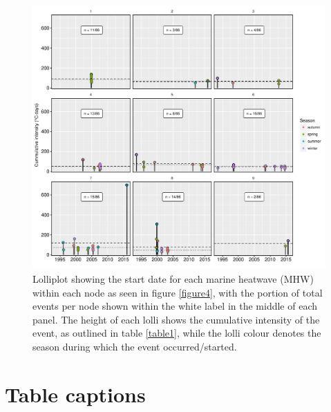 \documentclass[utf8]{frontiersSCNS}
\begin{document}
\begin{figure}[]
\begin{center}
\includegraphics[width=1.0\textwidth]{figure_5.pdf}
\end{center}
\caption{Lolliplot showing the start date for each marine heatwave (MHW) within each node as seen in figure \ref{figure4}, with the portion of total events per node shown within the white label in the middle of each panel. The height of each lolli shows the cumulative intensity of the event, as outlined in table \ref{table1}, while the lolli colour denotes the season during which the event occurred/started.}
\label{figure5}
\end{figure}


\section*{Table captions}
\end{document}
